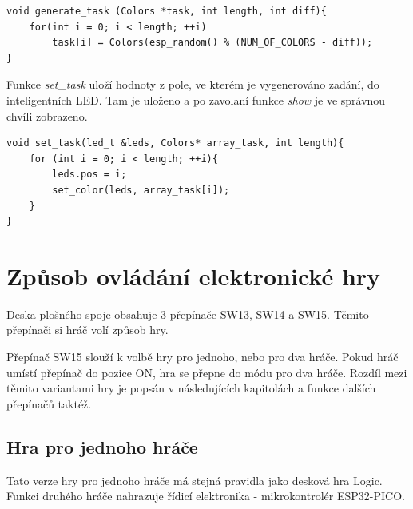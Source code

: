 \begin{minipage}{\linewidth}
\begin{lstlisting}[frame=single,numbers=right,caption={Funkce pro vygenerování zadání.},label=lst:priklad.vypis.kodu.C,basicstyle=\ttfamily\small, keywordstyle=\color{black}\bfseries\underbar,]
void generate_task (Colors *task, int length, int diff){
    for(int i = 0; i < length; ++i)
        task[i] = Colors(esp_random() % (NUM_OF_COLORS - diff));
}      
\end{lstlisting}
\end{minipage} 

Funkce {\it set\_task} uloží hodnoty z pole, ve kterém je vygenerováno zadání, do inteligentních LED. Tam je uloženo a po zavolaní funkce {\it show} je ve správnou 
chvíli zobrazeno.

\begin{minipage}{\linewidth}
\begin{lstlisting}[frame=single,numbers=right,caption={Funkce pro vygenerování zadání.},label=lst:priklad.vypis.kodu.C,basicstyle=\ttfamily\small, keywordstyle=\color{black}\bfseries\underbar,]
void set_task(led_t &leds, Colors* array_task, int length){
    for (int i = 0; i < length; ++i){
        leds.pos = i;
        set_color(leds, array_task[i]); 
    } 
}      
\end{lstlisting}
\end{minipage}

\fi

\chapter{Způsob ovládání elektronické hry}
Deska plošného spoje obsahuje 3 přepínače SW13, SW14 a SW15. Těmito přepínači si hráč volí způsob hry.

Přepínač SW15 slouží k volbě hry pro jednoho, nebo pro dva hráče. Pokud hráč umístí přepínač do pozice ON, hra se přepne
do módu pro dva hráče. Rozdíl mezi těmito variantami hry je popsán v následujících kapitolách a funkce dalších přepínačů taktéž.

\section{Hra pro jednoho hráče}
Tato verze hry pro jednoho hráče má stejná pravidla jako desková hra Logic. Funkci druhého hráče nahrazuje řídicí elektronika
- mikrokontrolér ESP32-PICO.

